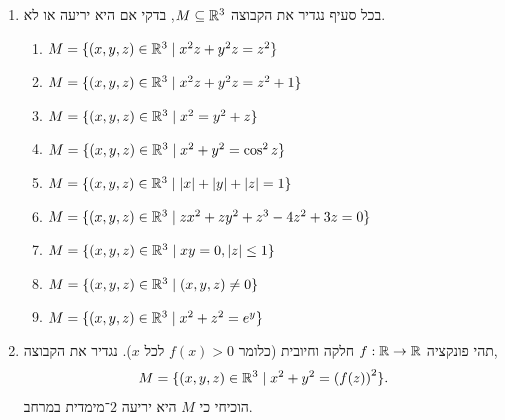 \begin{enumerate}
		כלומר פונקציה שמתארת לנו עבור כל נקודה מה ה''גובה'' שלה. אם לדוגמה נבחר את היריעה $X = [0, 1]$, כלומר קטע היחידה הסגור, אז נוכל לתאר את הגובה שלה בכמה דרכים,
		לדוגמה,
		\[
			h_1(t)
			= 0,
			\qquad
			h_2(t) = t
		.\]
		הפונקציה הראשונה מתארת את הגובה כאשר המוט שבחרנו שוכב על הרצפה, והפונקציה השנייה מתארת את הגובה כאשר המוט נעוץ בקרקע.
		באופן כללי נבחין כי לא קיימת פונקציית גובה יחידה ליריעה פרמטרית, אבל בתרגיל זה הפונקציה תהיה באופן גלובלי ההטלה על ציר $z$, כלומר הפונקציה,
		\[
			h(x, y, z)
			= z
		.\]
		והיא גורמת לזה שהפרמטריזציה תגדיר את הגובה בעצם הדרך שבה היא נתונה.
		בכל סעיף תופיע יריעה ועלייך לחשב את הגובה הממוצע של הנקודות, כלומר האינטגרל המנורמל של $h$ על היריעה.
		\begin{enumerate}
			\item מוט יושב,
				\[
					\varphi : [0, 1] \to \RR^3,
					\quad
					\varphi(t)
					= (t, 0, 0)
				.\]
			\item מוט עומד,
				\[
					\varphi : [0, 1] \to \RR^3,
					\quad
					\varphi(t)
					= (0, 0, t)
				.\]
			\item ריבוע יושב,
				\[
					\varphi : {[0, 1]}^2 \to \RR^3,
					\quad
					\varphi(t, s)
					= (t, s, 0)
				.\]
			\item ריבוע עומד,
				\[
					\varphi : {[0, 1]}^2 \to \RR^3,
					\quad
					\varphi(t, s)
					= (0, t, s)
				.\]
			\item גליל ברדיוס $R$ וגובה $H$,
				\[
					\varphi : [0, 2 \pi] \times [0, H],
					\quad
					\varphi(s, t)
					= (R \cos s, R \sin s, t)
				.\]
		\end{enumerate}
	\item בכל סעיף נגדיר את הקבוצה $M \subseteq \mathbb{R}^3$, בדקי אם היא יריעה או לא.
		\begin{enumerate}
			\item $M = \{ (x, y, z) \in \mathbb{R}^3 \mid x^2 z + y^2 z = z^2 \}$
			\item $M = \{ (x, y, z) \in \mathbb{R}^3 \mid x^2 z + y^2 z = z^2 + 1 \}$
			\item $M = \{ (x, y, z) \in \mathbb{R}^3 \mid x^2 = y^2 + z \}$
			\item $M = \{ (x, y, z) \in \mathbb{R}^3 \mid x^2 + y^2 = \cos^2 z \}$
			\item $M = \{ (x, y, z) \in \mathbb{R}^3 \mid |x| + |y| + |z| = 1 \}$
			\item $M = \{ (x, y, z) \in \mathbb{R}^3 \mid zx^{2}+zy^{2}+z^{3}-4z^{2}+3z=0 \}$
			\item $M = \{ (x, y, z) \in \mathbb{R}^3 \mid x y = 0, |z| \le 1 \}$
			\item $M = \{ (x, y, z) \in \mathbb{R}^3 \mid (x, y, z) \ne 0 \}$
			\item $M = \{ (x, y, z) \in \mathbb{R}^3 \mid x^{2}+z^{2}=e^{y} \}$
		\end{enumerate}
	\item תהי פונקציה $f : \mathbb{R} \to \mathbb{R}$ חלקה וחיובית (כלומר $f(x) > 0$ לכל $x$).
		נגדיר את הקבוצה,
		\[
			M
			= \{ (x, y, z) \in \mathbb{R}^3 \mid x^2 + y^2 = {(f(z))}^2 \}
		.\]
		הוכיחי כי $M$ היא יריעה $2$־מימדית במרחב.
\end{enumerate}


